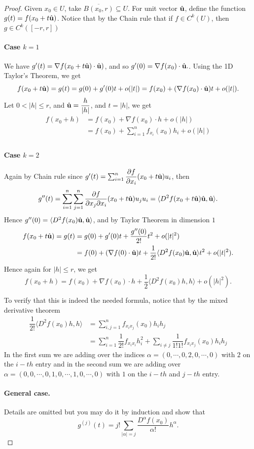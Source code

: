 \documentclass[11pt,openany]{book}
\theoremstyle{plain}
\theoremstyle{definition}
\theoremstyle{remark}
\begin{document}
\begin{proof}
    Given $x_0\in U$, take $\overline{B(x_0,r)}\subseteq U$. For unit vector $\hat{\bf u}$, define the function $g(t)=f(x_0+t\hat {\bf u})$.
    Notice that by the Chain rule that if $f\in C^k(U)$, then $g\in C^k([-r,r])$

\paragraph{\bf Case $k=1$}
We have $g'(t)=\nabla f(x_0+t\hat {\bf u})\cdot \hat{\bf u})$, and so 
$g'(0)=\nabla f(x_0)\cdot \hat{\bf u}.$. Using the 1D Taylor's Theorem, we get
$$f(x_0+t\hat{\bf u})=g(t)=g(0)+g'(0)t+o(|t|)=f(x_0)+(\nabla f(x_0)\cdot \hat{\bf u})t+o(|t|).$$
Let $0<|h|\leq r$, and $\hat{\bf u}=\dfrac{h}{|h|}$, and $t=|h|$, we get
\begin{align*}
    f(x_0+h)&=f(x_0)+\nabla f(x_0)\cdot h+o(|h|)\\
    &=f(x_0)+\sum_{i=1}^n f_{x_i}(x_0)h_i+o(|h|)\\
\end{align*}

\paragraph{\bf Case $k=2$}
Again by Chain rule since $g'(t)=\sum_{i=1}^n\dfrac{\partial f}{\partial x_i}(x_0+t\hat {\bf u})u_i$,
then 
$$g''(t)=\sum_{i=1}^n \sum_{j=1}^n \dfrac{\partial f}{\partial x_j\partial x_i}(x_0+t\hat {\bf u})u_ju_i=\langle D^2f(x_0+t\hat{\bf u})\hat{\bf u},\hat{\bf u}\rangle.$$
Hence $g''(0)=\langle D^2f(x_0)\hat{\bf u},\hat{\bf u}\rangle$, and by Taylor Theorem in dimension $1$
\begin{align*}
    f(x_0+t\hat{\bf u})=g(t)&=g(0)+g'(0)t+\dfrac{g''(0)}{2!}t^2+o(|t|^2)\\
    &=f(0)+(\nabla f(0)\cdot\hat{\bf u})t+\dfrac{1}{2!}\langle D^2f(x_0)\hat{\bf u},\hat{\bf u}\rangle t^2+o(|t|^2).
\end{align*}
Hence again for $|h|\leq r$, we get
$$f(x_0+h)=f(x_0)+\nabla f(x_0)\cdot h+\dfrac{1}{2}\langle D^2f(x_0)h,h\rangle+o(|h|^2).$$

To verify that this is indeed the needed formula, notice that by the mixed derivative theorem
\begin{align*}
    \dfrac{1}{2!}\langle D^2f(x_0)h,h\rangle&=\sum_{i,j=1}^n f_{x_ix_j}(x_0)h_ih_j\\
    &=\sum_{i=1}^n\dfrac{1}{2!}f_{x_ix_i}h_i^2+\sum_{i\neq j}\dfrac{1}{1!1!}f_{x_ix_j}(x_0)h_ih_j
\end{align*}
In the first sum we are adding over the indices $\alpha=(0,\cdots,0,2,0,\cdots,0)$ with $2$ on the $i-th$ entry
and in the second sum we are adding over 
$\alpha=(0,0,\cdots,0,1,0,\cdots,1,0,\cdots,0)$ with $1$ on the $i-th$ and $j-th$ entry.

\paragraph{\bf General case.} Details are omitted but you may do it by induction and show that
$$g^{(j)}(t)=j!\sum_{|\alpha|=j}\dfrac{D^\alpha f(x_0)}{\alpha!}h^{\alpha}.$$
\end{proof}
\end{document}
